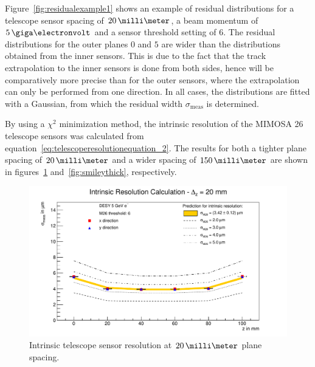 Figure~\ref{fig:residualexample1} shows an example of residual distributions for
a telescope sensor spacing of $20\,\milli\meter$, a beam momentum of
$5\,\giga\electronvolt$ and a sensor threshold setting of $6$. 
The residual distributions for the outer planes $0$ and $5$ are wider than the distributions obtained from the inner sensors. 
This is due to the fact that the track
extrapolation to the inner sensors is done from both sides, hence will be comparatively more precise than for the outer sensors, where the extrapolation can only be performed from one direction. 
In all cases, the distributions are fitted with a Gaussian, from which the residual width $\sigma_{\textrm{meas}}$ is determined.



% 

By using a $\chi^{2}$ minimization method, the intrinsic resolution of the
{MIMOSA 26} telescope sensors was calculated from
equation~\ref{eq:telescoperesolutionequation_2}. The results for both a tighter
plane spacing of $20\,\milli\meter$ and a wider spacing of $150\,\milli\meter$
are shown in figures~\ref{fig:smileythin} and~\ref{fig:smileythick},
respectively.

\begin{figure}[hbtp]
\centering
\includegraphics[width=\textwidth]{figures/thin_smiley.pdf}
\caption[Intrinsic telescope sensor resolution at $20\,\milli\meter$ plane
spacing]{Intrinsic telescope sensor resolution at $20\,\milli\meter$ plane
spacing.}
\label{fig:smileythin}
\end{figure}



